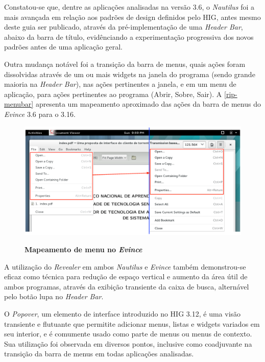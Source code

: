 Constatou-se que, dentre as aplicações analisadas na versão 3.6, o
\textit{Nautilus} foi a mais avançada em relação aos padrões de design definidos
pelo HIG, antes mesmo deste guia ser publicado, através da pré-implementação de
uma \textit{Header Bar}, abaixo da barra de título, evidênciando a
experimentação progressiva dos novos padrões antes de uma aplicação geral.

Outra mudança notável foi a transição da barra de menus, quais ações foram
dissolvidas através de um ou mais widgets na janela do programa (sendo grande
maioria na \textit{Header Bar}), nas ações pertinentes a janela, e em um menu de
aplicação, para ações pertinentes ao programa (Abrir, Sobre, Sair). A  
\autoref{rip-menubar} apresenta um mapeamento aproximado das ações da barra de 
menus do \textit{Evince} 3.6 para o 3.16.

\begin{figure}[!ht]
  \begin{center}
    \caption{\textbf{Mapeamento de menu no \textit{Evince}}}
    \includegraphics [width=\textwidth]{image/evince-menubar-mapping.eps}
    \label{rip-menubar}
  \end{center}
\end{figure}

A utilização do \textit{Revealer} em ambos \textit{Nautilus} e \textit{Evince}
também demonstrou-se eficaz como técnica para redução de espaço vertical e
aumento da área útil de ambos programas, através da exibição transiente da caixa
de busca, alternável pelo botão lupa no \textit{Header Bar}.

O \textit{Popover}, um elemento de interface introduzido no HIG 3.12, é uma
visão transiente e flutuante que permitite adicionar menus, listas e widgets
variados em seu interior, e é comumente usado como parte de menus ou menus de
contexto. Sua utilização foi observada em diversos pontos, inclusive como
coadjuvante na transição da barra de menus em todas aplicações analisadas.

